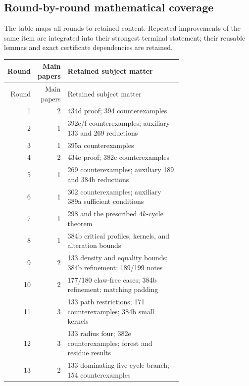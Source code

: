 \documentclass[11pt,a4paper]{article}
\theoremstyle{definition}\newtheorem{definition}[theorem]{Definition}
\theoremstyle{remark}\newtheorem{remark}[theorem]{Remark}
\begin{document}
\subsection{Round-by-round mathematical coverage}
The table maps all rounds to retained content. Repeated improvements
of the same item are integrated into their strongest terminal statement;
their reusable lemmas and exact certificate dependencies are retained.
\begin{longtable}{rrp{0.70\linewidth}}
\toprule
Round&Main papers&Retained subject matter\\\midrule
\endfirsthead
\toprule Round&Main papers&Retained subject matter\\\midrule
\endhead

1&2&434d proof; 394 counterexamples\\[3pt]

2&1&392e/f counterexamples; auxiliary 133 and 269 reductions\\[3pt]

3&1&395a counterexamples\\[3pt]

4&2&434e proof; 382c counterexamples\\[3pt]

5&1&269 counterexamples; auxiliary 189 and 384b reductions\\[3pt]

6&1&302 counterexamples; auxiliary 389a sufficient conditions\\[3pt]

7&1&298 and the prescribed $4k$-cycle theorem\\[3pt]

8&1&384b critical profiles, kernels, and alteration bounds\\[3pt]

9&2&133 density and equality bounds; 384b refinement; 189/199 notes\\[3pt]

10&2&177/180 claw-free cases; 384b refinement; matching padding\\[3pt]

11&3&133 path restrictions; 171 counterexamples; 384b small kernels\\[3pt]

12&3&133 radius four; 382e counterexamples; forest and residue results\\[3pt]

13&2&133 dominating-five-cycle branch; 154 counterexamples\\[3pt]


\end{longtable}
\end{document}
